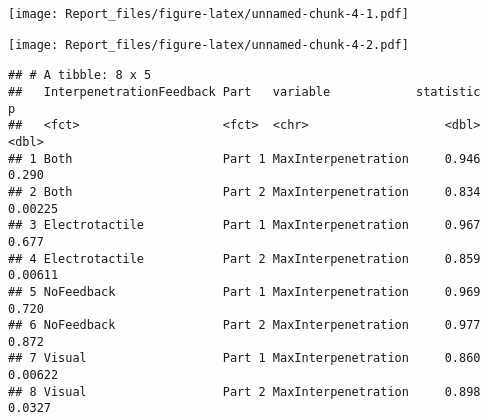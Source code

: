 \documentclass[
]{article}
\newenvironment{Shaded}{\begin{snugshade}}{\end{snugshade}}
\newcommand{\KeywordTok}[1]{\textcolor[rgb]{0.13,0.29,0.53}{\textbf{#1}}}
\newcommand{\NormalTok}[1]{#1}
\newcommand{\OperatorTok}[1]{\textcolor[rgb]{0.81,0.36,0.00}{\textbf{#1}}}
\newcommand{\StringTok}[1]{\textcolor[rgb]{0.31,0.60,0.02}{#1}}
\begin{document}
\begin{Shaded}
\end{Shaded}

\texttt{[image: Report\_files/figure-latex/unnamed-chunk-4-1.pdf]}

\begin{Shaded}
\end{Shaded}

\texttt{[image: Report\_files/figure-latex/unnamed-chunk-4-2.pdf]}

\begin{Shaded}
\end{Shaded}

\begin{verbatim}
## # A tibble: 8 x 5
##   InterpenetrationFeedback Part   variable            statistic       p
##   <fct>                    <fct>  <chr>                   <dbl>   <dbl>
## 1 Both                     Part 1 MaxInterpenetration     0.946 0.290  
## 2 Both                     Part 2 MaxInterpenetration     0.834 0.00225
## 3 Electrotactile           Part 1 MaxInterpenetration     0.967 0.677  
## 4 Electrotactile           Part 2 MaxInterpenetration     0.859 0.00611
## 5 NoFeedback               Part 1 MaxInterpenetration     0.969 0.720  
## 6 NoFeedback               Part 2 MaxInterpenetration     0.977 0.872  
## 7 Visual                   Part 1 MaxInterpenetration     0.860 0.00622
## 8 Visual                   Part 2 MaxInterpenetration     0.898 0.0327
\end{verbatim}

\begin{Shaded}
\end{Shaded}
\end{document}
